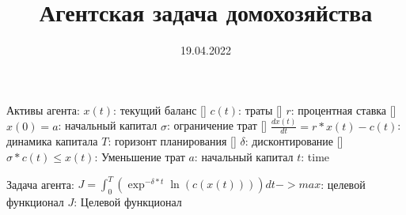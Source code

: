 \documentclass{a_model}
\title{Агентская задача домохозяйства}
\date{19.04.2022}
\begin{document}
Активы агента:
    $x(t)$: текущий баланс []
    $c(t)$: траты []
    $r$: процентная ставка []
    $x(0) = a$: начальный капитал
    $\sigma$: ограничение трат []
    $\frac{dx(t)}{dt} = r*x(t)-c(t)$: динамика капитала
    $T$: горизонт планирования []
    $\delta$: дисконтирование []
    $\sigma*c(t)\leq x(t)$: Уменьшение трат
    $a$: начальный капитал
    $t$: time

Задача агента:
    $J = \int_0^T (\exp^{-\delta*t} \ln(c(x(t))))dt -> max$: целевой функционал
    $J$: Целевой функционал
\end{document}
